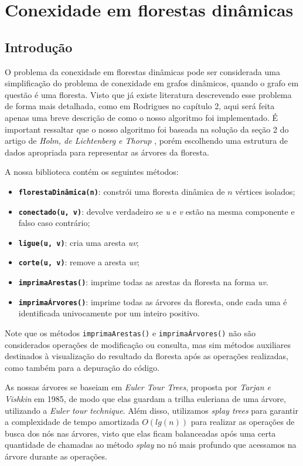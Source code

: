 
\chapter{Conexidade em florestas dinâmicas}

\section{Introdução}

O problema da conexidade em florestas dinâmicas pode ser considerada uma simplificação do problema de conexidade em grafos dinâmicos, quando o grafo em questão é uma floresta. Visto que já existe literatura descrevendo esse problema de forma mais detalhada, como em Rodrigues \cite{arthur} no capítulo 2, aqui será feita apenas uma breve descrição de como o nosso algoritmo foi implementado. É important ressaltar que o nosso algoritmo foi baseada na solução da seção 2 do artigo de \textit{Holm, de Lichtenberg e Thorup} \cite{jacob_holm}, porém escolhendo uma estrutura de dados apropriada para representar as árvores da floresta.

A nossa biblioteca contém os seguintes métodos:

\begin{itemize}
    \item \texttt{\textbf{florestaDinâmica(n)}}: constrói uma floresta dinâmica de $n$ vértices isolados;
    \item \texttt{\textbf{conectado(u, v)}}: devolve verdadeiro se \textit{u} e \textit{v} estão na mesma componente e falso caso contrário;
    \item \texttt{\textbf{ligue(u, v)}}: cria uma aresta \textit{uv};
    \item \texttt{\textbf{corte(u, v)}}: remove a aresta \textit{uv};
    \item \texttt{\textbf{imprimaArestas()}}: imprime todas as arestas da floresta na forma \textit{uv}.
    \item \texttt{\textbf{imprimaÁrvores()}}: imprime todas as árvores da floresta, onde cada uma é identificada univocamente por um inteiro positivo.
\end{itemize}

Note que os métodos \texttt{imprimaArestas()} e \texttt{imprimaÁrvores()} não são considerados operações de modificação ou consulta, mas sim métodos auxiliares destinados à visualização do resultado da floresta após as operações realizadas, como também para a depuração do código.  

As nossas árvores se baseiam em \textit{Euler Tour Trees}, proposta por \textit{Tarjan e Vishkin} \cite{tarjan} em 1985, de modo que elas guardam a trilha euleriana de uma árvore, utilizando a \textit{Euler tour technique}. Além disso, utilizamos \textit{splay trees} para garantir a complexidade de tempo amortizada $O(lg(n))$ para realizar as operações de busca dos nós nas árvores, visto que elas ficam balanceadas após uma certa quantidade de chamadas ao método \textit{splay} no nó mais profundo que acessamos na árvore durante as operações.  
